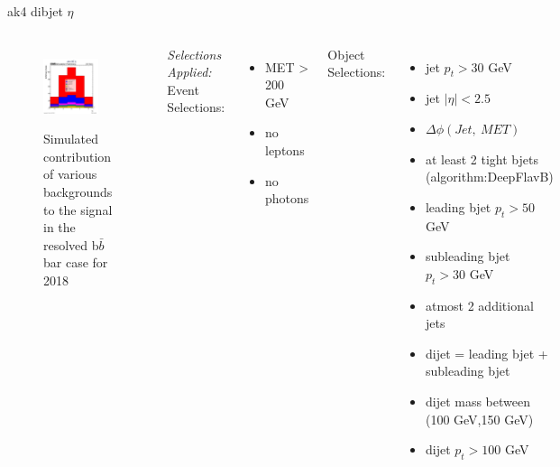 \documentclass[10pt,xcolor=dvipsnames,aspectratio=169]{beamer}
\begin{document}

\begin{frame}[fragile]{ak4 dibjet $\eta$ } 
  \begin{columns}
    \begin{figure}
      \centering
      \includegraphics[width=0.8\textwidth]{../Backgrounds/plots/SR_Resolved_Backgrounds_dijets_eta_Combined.png}
      \label{contribution}
      \caption{Simulated contribution of various backgrounds to the signal in the resolved b$ \bar{b} $ bar case for 2018}
    \end{figure}
    \textit{Selections Applied:} \\
    Event Selections:
    \begin{itemize}
      \raggedright 
      \tiny
      \item {MET > 200 GeV}
      \item {no leptons}
      \item {no photons}
    \end{itemize}
    Object Selections:
    \begin{itemize}
      \raggedright 
      \tiny
      \item {jet $p_t > 30 $ GeV}
      \item {jet $| \eta | < 2.5 $}
      \item {$\Delta \phi (Jet, \ MET)$}
      \item {at least 2 tight bjets (algorithm:DeepFlavB)}
      \item {leading bjet $p_t > 50 $ GeV}
      \item {subleading bjet $p_t > 30 $ GeV}
      \item {atmost 2 additional jets}
      \item {dijet = leading bjet + subleading bjet}
      \item {dijet mass between (100 GeV,150 GeV)}
      \item {dijet $p_t > 100 $ GeV}
    \end{itemize}
  \end{columns}
\end{frame}
\end{document}
